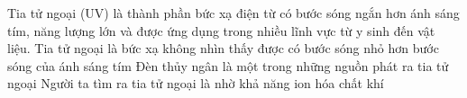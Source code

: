 \begin{ex}
Tia tử ngoại (UV) là thành phần bức xạ điện từ có bước sóng ngắn hơn ánh sáng tím, năng lượng lớn và được ứng dụng trong nhiều lĩnh vực từ y sinh đến vật liệu.
{\True Tia tử ngoại là bức xạ không nhìn thấy được có bước sóng nhỏ hơn bước sóng của ánh sáng tím}
{\True Đèn thủy ngân là một trong những nguồn phát ra tia tử ngoại}
{\True Người ta tìm ra tia tử ngoại là nhờ khả năng ion hóa chất khí}
\end{ex} 


























